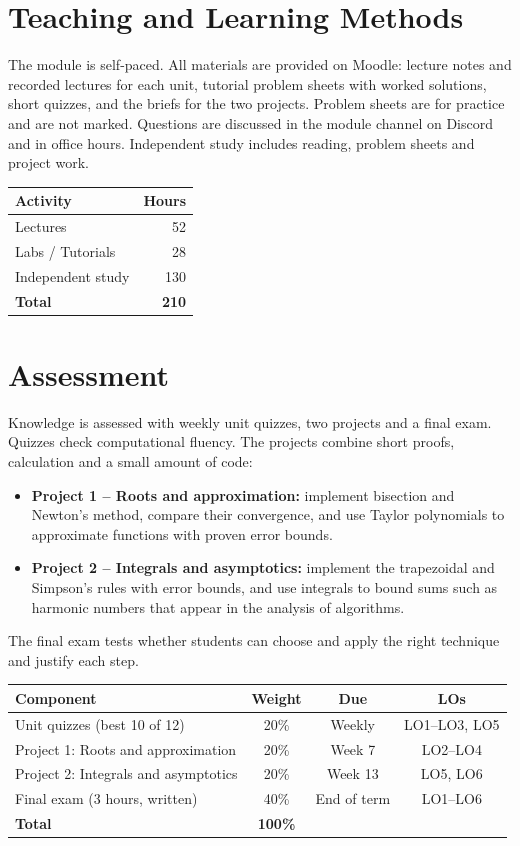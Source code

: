 \documentclass[11pt,a4paper]{article}
\begin{document}
\section{Teaching and Learning Methods}
The module is self-paced. All materials are provided on Moodle: lecture notes and
recorded lectures for each unit, tutorial problem sheets with worked solutions,
short quizzes, and the briefs for the two projects. Problem sheets are for practice
and are not marked. Questions are discussed in the module channel on Discord and in
office hours. Independent study includes reading, problem sheets and project work.

\begin{tabularx}{0.6\textwidth}{X r}
\toprule
\textbf{Activity} & \textbf{Hours} \\
\midrule
Lectures            & 52 \\
Labs / Tutorials    & 28 \\
Independent study   & 130 \\
\midrule
\textbf{Total}      & \textbf{210} \\
\bottomrule
\end{tabularx}

\section{Assessment}
Knowledge is assessed with weekly unit quizzes, two projects and a final
exam. Quizzes check computational fluency. The projects combine short proofs,
calculation and a small amount of code:
\begin{itemize}
  \item \textbf{Project 1 -- Roots and approximation:} implement bisection and
        Newton's method, compare their convergence, and use Taylor polynomials to
        approximate functions with proven error bounds.
  \item \textbf{Project 2 -- Integrals and asymptotics:} implement the trapezoidal
        and Simpson's rules with error bounds, and use integrals to bound sums such as
        harmonic numbers that appear in the analysis of algorithms.
\end{itemize}
The final exam tests whether students can choose and apply the right technique and
justify each step.

\begin{tabularx}{\textwidth}{X c c c}
\toprule
\textbf{Component} & \textbf{Weight} & \textbf{Due} & \textbf{LOs} \\
\midrule
Unit quizzes (best 10 of 12) & 20\% & Weekly & LO1--LO3, LO5 \\
Project 1: Roots and approximation & 20\% & Week 7 & LO2--LO4 \\
Project 2: Integrals and asymptotics & 20\% & Week 13 & LO5, LO6 \\
Final exam (3 hours, written) & 40\% & End of term & LO1--LO6 \\
\midrule
\textbf{Total}      & \textbf{100\%} & & \\
\bottomrule
\end{tabularx}
\end{document}
